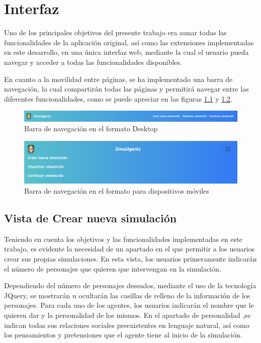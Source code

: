 \chapter{Interfaz}
\label{cap:interfaz}

Uno de los principales objetivos del presente trabajo era aunar todas las funcionalidades de la aplicación original, así como las extensiones implementadas en este desarrollo, en una única interfaz web, mediante la cual el usuario pueda navegar y acceder a todas las funcionalidades disponibles.

En cuanto a la movilidad entre páginas, se ha implementado una barra de navegación, la cual compartirán todas las páginas y permitirá navegar entre las diferentes funcionalidades, como se puede apreciar en las figuras \ref{fig:navBarDesktop} y \ref{fig:navBarMobile}.

\begin{figure}[h]
	\centering
	\includegraphics[width = 1\textwidth]{Imagenes/Vectorial/navBarDesktop.png}
	\caption{Barra de navegación en el formato Desktop}
	\label{fig:navBarDesktop}
\end{figure}

\begin{figure}[h]
	\centering
	\includegraphics[width = 1\textwidth]{Imagenes/Vectorial/navBarMobile.png}
	\caption{Barra de navegación en el formato para dispositivos móviles}
	\label{fig:navBarMobile}
\end{figure}

\section{Vista de Crear nueva simulación}

Teniendo en cuenta los objetivos y las funcionalidades implementadas en este trabajo, es evidente la necesidad de un apartado en el que permitir a los usuarios crear sus propias simulaciones. En esta vista, los usuarios primeramente indicarán el número de personajes que quieren que intervengan en la simulación.

Dependiendo del número de personajes deseados, mediante el uso de la tecnología JQuery, se mostrarán u ocultarán las casillas de relleno de la información de los personajes. Para cada uno de los agentes, los usuarios indicarán el nombre que le quieren dar y la personalidad de los mismos. En el apartado de personalidad ,se indican todas sus relaciones sociales preexistentes en lenguaje natural, así como los pensamientos y pretensiones que el agente tiene al inicio de la simulación.

